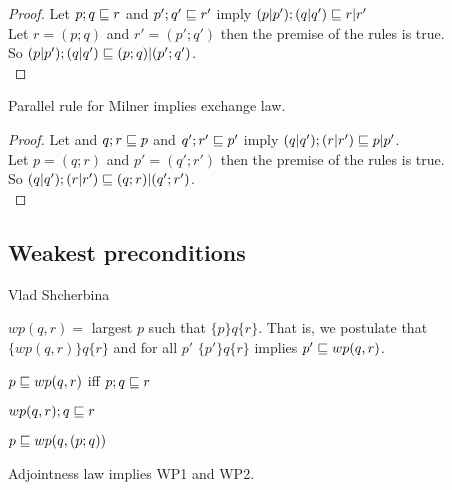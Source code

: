 \documentclass{article}
\begin{document}
\verified

\begin{proof}
Let $p; q \sqsubseteq r$ and $p'; q' \sqsubseteq r'$ imply $(p | p'); (q | q') \sqsubseteq r | r'$\\
Let $r = (p; q)$ and $r' = (p'; q')$ then the premise of the rules is true.\\
So $(p | p'); (q | q') \sqsubseteq (p; q) | (p'; q')$.\\
\end{proof}

\begin{theorem}
Parallel rule for Milner implies exchange law.
\end{theorem}

\verified

\begin{proof}
Let and $q; r \sqsubseteq p$ and $q'; r' \sqsubseteq p'$ imply $(q | q'); (r | r') \sqsubseteq p | p'$.\\
Let $p = (q; r)$ and $p' = (q'; r')$ then the premise of the rules is true.\\
So $(q | q'); (r | r') \sqsubseteq (q; r) | (q'; r')$.\\
\end{proof}

\subsection*{Weakest preconditions}

Vlad Shcherbina

\begin{definition}
$wp(q, r) =$ largest $p$ such that $\{p\}q\{r\}$.
That is, we postulate that $\{wp(q, r)\} q \{r\}$ and
for all $p'$ $\{p'\}q\{r\}$ implies $p' \sqsubseteq wp(q, r)$.
\end{definition}

\begin{law}[Adjointness]
$p \sqsubseteq wp(q, r)$ iff $p; q \sqsubseteq r$
\end{law}

\begin{rul}[WP1]
$wp(q, r); q \sqsubseteq r$
\end{rul}

\begin{rul}[WP2]
$p \sqsubseteq wp(q, (p; q))$
\end{rul}

\begin{theorem}
Adjointness law implies WP1 and WP2.
\end{theorem}
\end{document}
